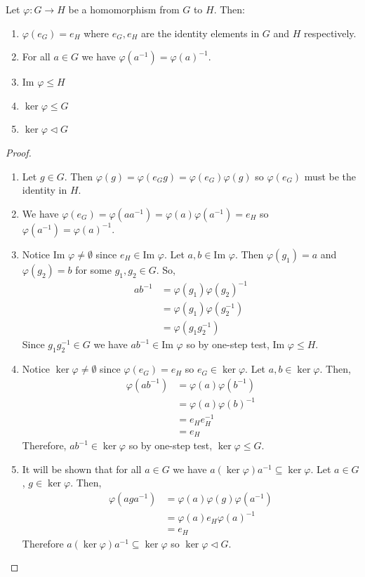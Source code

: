 \documentclass[12pt]{article}
\newcommand{\inv}{^{-1}}
\renewcommand{\Im}{\text{Im }}
\begin{document}
	\begin{mythm}{}{}
		Let $\varphi:G\to H$ be a homomorphism from $G$ to $H$. Then:
		\begin{enumerate}
			\item $\varphi(e_G)=e_H$ where $e_G, e_H$ are the identity elements in $G$ and $H$ respectively.
			\item For all $a\in G$ we have $\varphi(a\inv)=\varphi(a)\inv$.
			\item $\Im\varphi\leq H$
			\item $\ker\varphi\leq G$
			\item $\ker\varphi\lhd G$
		\end{enumerate}
		\begin{proof}~\\
			\begin{enumerate}
				\item Let $g\in G$. Then $\varphi(g)=\varphi(e_Gg)=\varphi(e_G)\varphi(g)$ so $\varphi(e_G)$ must be the identity in $H$.
				\item We have $\varphi(e_G)=\varphi(aa\inv)=\varphi(a)\varphi(a\inv)=e_H$ so $\varphi(a\inv)=\varphi(a)\inv$.
				\item Notice $\Im\varphi\neq\emptyset$ since $e_H\in\Im\varphi$. Let $a, b\in\Im\varphi$. Then $\varphi(g_1)=a$ and $\varphi(g_2)=b$ for some $g_1, g_2\in G$. So,
				\begin{align*}
					ab\inv&=\varphi(g_1)\varphi(g_2)\inv\\
					&=\varphi(g_1)\varphi(g_2\inv)\\
					&=\varphi(g_1g_2\inv)
				\end{align*}
				Since $g_1g_2\inv\in G$ we have $ab\inv\in\Im\varphi$ so by one-step test, $\Im\varphi\leq H$.
				\item Notice $\ker\varphi\neq\emptyset$ since $\varphi(e_G)=e_H$ so $e_G\in\ker\varphi$. Let $a, b\in\ker\varphi$. Then,
				\begin{align*}
					\varphi(ab\inv)&=\varphi(a)\varphi(b\inv)\\
					&=\varphi(a)\varphi(b)\inv\\
					&=e_He_H\inv\\
					&=e_H
				\end{align*}
				Therefore, $ab\inv\in\ker\varphi$ so by one-step test, $\ker\varphi\leq G$.
				\item It will be shown that for all $a\in G$ we have $a(\ker\varphi)a\inv\subseteq\ker\varphi$. Let $a\in G$, $g\in\ker\varphi$. Then,
				\begin{align*}
					\varphi(aga\inv)&=\varphi(a)\varphi(g)\varphi(a\inv)\\
					&=\varphi(a)e_H\varphi(a)\inv\\
					&=e_H
				\end{align*}
				Therefore $a(\ker\varphi)a\inv\subseteq\ker\varphi$ so $\ker\varphi\lhd G$.
			\end{enumerate}
		\end{proof}
	\end{mythm}
	
\end{document}
